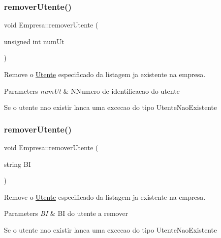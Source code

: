 \subsubsection{\texorpdfstring{remover\+Utente()}{removerUtente()}\hspace{0.1cm}{\footnotesize\ttfamily [1/2]}}
{\footnotesize\ttfamily void Empresa\+::remover\+Utente (\begin{DoxyParamCaption}\item[{unsigned int}]{num\+Ut }\end{DoxyParamCaption})}



Remove o \mbox{\hyperlink{class_utente}{Utente}} especificado da listagem ja existente na empresa. 


\begin{DoxyParams}{Parameters}
{\em num\+Ut} & N\+Numero de identificacao do utente\\
\hline
\end{DoxyParams}
Se o utente nao existir lanca uma excecao do tipo Utente\+Nao\+Existente \mbox{\label{class_empresa_a3550486deddb6eea8a94aa25fb4c5f37}} 
\subsubsection{\texorpdfstring{remover\+Utente()}{removerUtente()}\hspace{0.1cm}{\footnotesize\ttfamily [2/2]}}
{\footnotesize\ttfamily void Empresa\+::remover\+Utente (\begin{DoxyParamCaption}\item[{string}]{BI }\end{DoxyParamCaption})}



Remove o \mbox{\hyperlink{class_utente}{Utente}} especificado da listagem ja existente na empresa. 


\begin{DoxyParams}{Parameters}
{\em BI} & BI do utente a remover\\
\hline
\end{DoxyParams}
Se o utente nao existir lanca uma excecao do tipo Utente\+Nao\+Existente \mbox{\label{class_empresa_a345839f16710bfd88e3a5fbcf14a3909}} 
